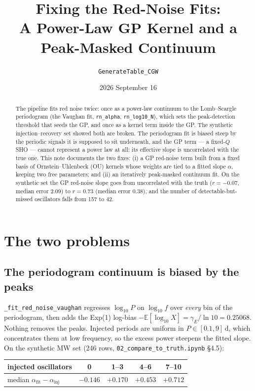 \documentclass[11pt]{article}
\title{Fixing the Red-Noise Fits:\\
       A Power-Law GP Kernel and a Peak-Masked Continuum}
\author{\texttt{GenerateTable\_CGW}}
\date{2026 September 16}
\newcommand{\code}[1]{\texttt{#1}}
\begin{document}
\maketitle

\begin{abstract}
The pipeline fits red noise twice: once as a power-law continuum to the Lomb--Scargle
periodogram (the Vaughan fit, \code{rn\_alpha}, \code{rn\_log10\_N}), which sets the
peak-detection threshold that seeds the GP, and once as a kernel term inside the GP.
The synthetic injection--recovery set showed both are broken. The periodogram fit is
biased steep by the periodic signals it is supposed to sit underneath, and the GP term
--- a fixed-$Q$ SHO --- cannot represent a power law at all: its effective slope is
uncorrelated with the true one. This note documents the two fixes: (i) a GP red-noise
term built from a fixed basis of Ornstein--Uhlenbeck (OU) kernels whose weights are tied
to a fitted slope $\alpha$, keeping two free parameters; and (ii) an iteratively
peak-masked continuum fit. On the synthetic set the GP red-noise slope goes from
uncorrelated with the truth ($r=-0.07$, median error 2.09) to $r=0.73$ (median error 0.38),
and the number of detectable-but-missed oscillators falls from 157 to 42.
\end{abstract}

\section{The two problems}

\subsection{The periodogram continuum is biased by the peaks}

\code{\_fit\_red\_noise\_vaughan} regresses $\log_{10}P$ on $\log_{10}f$ over
\emph{every} bin of the periodogram, then adds the Exp(1) log-bias
$-\mathbb{E}[\log_{10}X] = \gamma_E/\ln 10 = 0.25068$. Nothing removes the peaks. Injected
periods are uniform in $P \in [0.1, 9]$\,d, which concentrates them at low frequency,
so the excess power steepens the fitted slope. On the synthetic MW set (246 rows,
\code{02\_compare\_to\_truth.ipynb} \S4.5):

\begin{center}
\begin{tabular}{lcccc}
\toprule
injected oscillators & 0 & 1--3 & 4--6 & 7--10 \\
\midrule
median $\alpha_\mathrm{fit} - \alpha_\mathrm{inj}$ & $-0.146$ & $+0.170$ & $+0.453$ & $+0.712$ \\
\bottomrule
\end{tabular}
\end{center}
\end{document}
